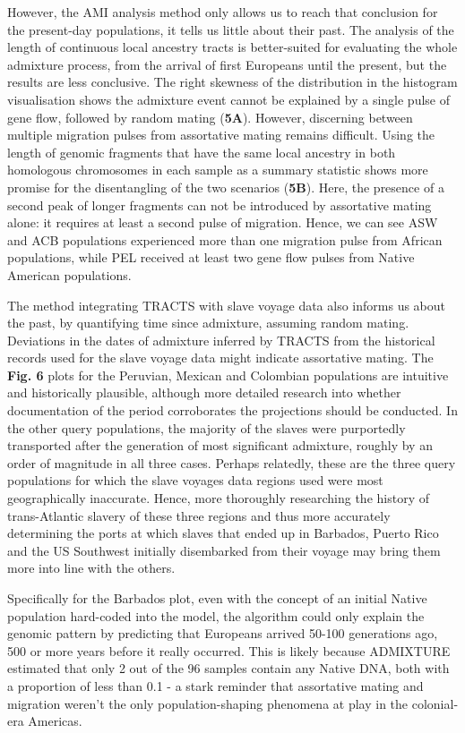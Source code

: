 \documentclass[11pt]{article}
\begin{document}
However, the AMI analysis method only allows us to reach that conclusion for the present-day populations, it tells us little about their past. The analysis of the length of continuous local ancestry tracts is better-suited for evaluating the whole admixture process, from the arrival of first Europeans until the present, but the results are less conclusive. The right skewness of the distribution in the histogram visualisation shows the admixture event cannot be explained by a single pulse of gene flow, followed by random mating (\textbf{5A}). However, discerning between multiple migration pulses from assortative mating remains difficult. Using the length of genomic fragments that have the same local ancestry in both homologous chromosomes in each sample as a summary statistic shows more promise for the disentangling of the two scenarios (\textbf{5B}). Here, the presence of a second peak of longer fragments can not be introduced by assortative mating alone: it requires at least a second pulse of migration. Hence, we can see ASW and ACB populations experienced more than one migration pulse from African populations, while PEL received at least two gene flow pulses from Native American populations.

The method integrating TRACTS with slave voyage data also informs us about the past, by quantifying time since admixture, assuming random mating. Deviations in the dates of admixture inferred by TRACTS from the historical records used for the slave voyage data might indicate assortative mating. The \textbf{Fig. 6} plots for the Peruvian, Mexican and Colombian populations are intuitive and historically plausible, although more detailed research into whether documentation of the period corroborates the projections should be conducted.
In the other query populations, the majority of the slaves were purportedly transported after the generation of most significant admixture, roughly by an order of magnitude in all three cases.  Perhaps relatedly, these are the three query populations for which the slave voyages data regions used were most geographically inaccurate. Hence, more thoroughly researching the history of trans-Atlantic slavery of these three regions and thus more accurately determining the ports at which slaves that ended up in Barbados, Puerto Rico and the US Southwest initially disembarked from their voyage may bring them more into line with the others. 

Specifically for the Barbados plot, even with the concept of an initial Native population hard-coded into the model, the algorithm could only explain the genomic pattern by predicting that Europeans arrived 50-100 generations ago, 500 or more years before it really occurred. This is likely because ADMIXTURE estimated that only 2 out of the 96 samples contain any Native DNA, both with a proportion of less than 0.1 - a stark reminder that assortative mating and migration weren't the only population-shaping phenomena at play in the colonial-era Americas.
\end{document}
